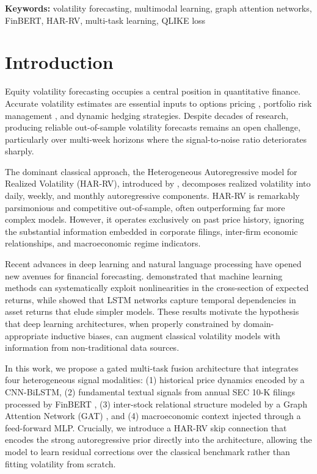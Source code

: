 \documentclass[12pt, a4paper]{article}
\begin{document}
\textbf{Keywords:} volatility forecasting, multimodal learning, graph attention networks, FinBERT, HAR-RV, multi-task learning, QLIKE loss

\newpage
\tableofcontents
\newpage

\section{Introduction}
\label{sec:intro}

Equity volatility forecasting occupies a central position in quantitative finance. Accurate volatility estimates are essential inputs to options pricing \citep{black1973pricing}, portfolio risk management \citep{markowitz1952portfolio}, and dynamic hedging strategies. Despite decades of research, producing reliable out-of-sample volatility forecasts remains an open challenge, particularly over multi-week horizons where the signal-to-noise ratio deteriorates sharply.

The dominant classical approach, the Heterogeneous Autoregressive model for Realized Volatility (HAR-RV), introduced by \citet{corsi2009simple}, decomposes realized volatility into daily, weekly, and monthly autoregressive components. HAR-RV is remarkably parsimonious and competitive out-of-sample, often outperforming far more complex models. However, it operates exclusively on past price history, ignoring the substantial information embedded in corporate filings, inter-firm economic relationships, and macroeconomic regime indicators.

Recent advances in deep learning and natural language processing have opened new avenues for financial forecasting. \citet{gu2020empirical} demonstrated that machine learning methods can systematically exploit nonlinearities in the cross-section of expected returns, while \citet{fischer2018deep} showed that LSTM networks capture temporal dependencies in asset returns that elude simpler models. These results motivate the hypothesis that deep learning architectures, when properly constrained by domain-appropriate inductive biases, can augment classical volatility models with information from non-traditional data sources.

In this work, we propose a gated multi-task fusion architecture that integrates four heterogeneous signal modalities: (1) historical price dynamics encoded by a CNN-BiLSTM, (2) fundamental textual signals from annual SEC 10-K filings processed by FinBERT \citep{yang2020finbert}, (3) inter-stock relational structure modeled by a Graph Attention Network (GAT) \citep{velivckovic2018graph}, and (4) macroeconomic context injected through a feed-forward MLP. Crucially, we introduce a HAR-RV skip connection that encodes the strong autoregressive prior directly into the architecture, allowing the model to learn residual corrections over the classical benchmark rather than fitting volatility from scratch.
\end{document}
